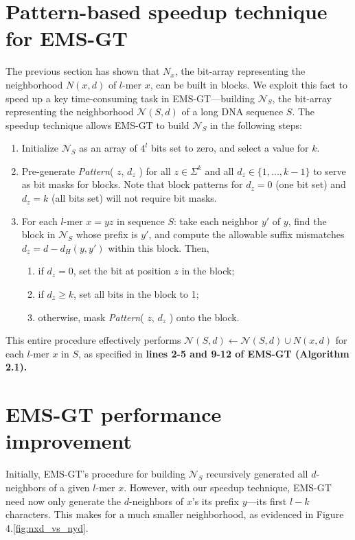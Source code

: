 \documentclass[oneside,12pt]{DISCSthesis}
\begin{document}
{	\section{Pattern-based speedup technique for EMS-GT}
		The previous section has shown that $N_x$, the bit-array representing the neighborhood $N(x,d)$ of $l$-mer $x$, can be built in blocks. We exploit this fact to speed up a key time-consuming task in EMS-GT---building $\mathcal{N}_S$, the bit-array representing the neighborhood $\mathcal{N}(S,d)$ of a long DNA sequence $S$. The speedup technique allows EMS-GT to build $\mathcal{N}_S$ in the following steps:
		\begin{enumerate}
			\item Initialize $\mathcal{N}_S$ as an array of $4^l$ bits set to zero, and select a value for $k$.
			\item Pre-generate {\em Pattern}( $z$, $d_z$ ) for all $z \in \Sigma^k$ and all $d_z \in \{1,...,k-1\}$ to serve as bit masks for blocks. Note that block patterns for $d_z=0$ (one bit set) and $d_z=k$ (all bits set) will not require bit masks.
			\item For each $l$-mer $x = yz$ in sequence $S$: take each neighbor $y'$ of $y$, find the block in $\mathcal{N}_S$ whose prefix is $y'$, and compute the allowable suffix mismatches $d_z = d - d_H(y,y')$ within this block. Then,
			\begin{enumerate}
				\item if $d_z = 0$, set the bit at position $z$ in the block;
				\item if $d_z \geq k$, set all bits in the block to 1;
				\item otherwise, mask {\em Pattern}( $z$, $d_z$ ) onto the block.
				\end{enumerate}
			\end{enumerate}
		\noindent This entire procedure effectively performs $\mathcal{N}(S,d) \leftarrow \mathcal{N}(S,d) \cup N(x,d)$ for each $l$-mer $x$ in $S$, as specified in {\bf lines 2-5 and 9-12 of EMS-GT (Algorithm 2.1).}
		\newpage

	\section{EMS-GT performance improvement}
		Initially, EMS-GT's procedure for building $\mathcal{N}_S$ recursively generated all $d$-neighbors of a given $l$-mer $x$.
		However, with our speedup technique, EMS-GT need now only generate the $d$-neighbors of $x$'s its prefix $y$---its first $l-k$ characters. This makes for a much smaller neighborhood, as evidenced in Figure 4.\ref{fig:nxd_vs_nyd}.\\

}
\end{document}
